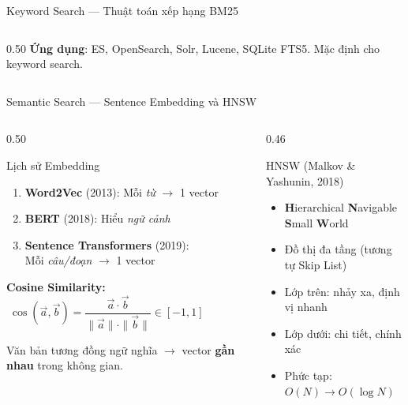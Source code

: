 \begin{frame}{Keyword Search --- Thuật toán xếp hạng BM25}
\begin{columns}[T]
\begin{column}{0.50\textwidth}
\vspace{0.05cm}
{\footnotesize
\textbf{Ứng dụng}: ES, OpenSearch, Solr, Lucene, SQLite FTS5. Mặc định cho keyword search.}

\end{column}
\end{columns}
\end{frame}

\begin{frame}{Semantic Search --- Sentence Embedding và HNSW}
\begin{columns}[T]
\begin{column}{0.50\textwidth}

\begin{block}{Lịch sử Embedding}
{\small
\begin{enumerate}\itemsep0pt \parskip0pt 
    \item \textbf{Word2Vec} (2013): Mỗi \textit{từ} $\to$ 1 vector
    \item \textbf{BERT} (2018): Hiểu \textit{ngữ cảnh}
    \item \textbf{Sentence Transformers} (2019):\\Mỗi \textit{câu/đoạn} $\to$ 1 vector
\end{enumerate}
}
\end{block}

\vspace{0.05cm}

\textbf{Cosine Similarity:}
$\;\cos(\vec{a}, \vec{b}) = \dfrac{\vec{a} \cdot \vec{b}}{\|\vec{a}\| \cdot \|\vec{b}\|} \in [-1, 1]$

\vspace{0.1cm}
{\footnotesize Văn bản tương đồng ngữ nghĩa $\to$ vector \textbf{gần nhau} trong không gian.}

\end{column}
\begin{column}{0.46\textwidth}

\begin{exampleblock}{HNSW {\scriptsize (Malkov \& Yashunin, 2018)}}
{\small
\begin{itemize}\itemsep0pt \parskip0pt 
    \item \textbf{H}ierarchical \textbf{N}avigable \textbf{S}mall \textbf{W}orld
    \item Đồ thị đa tầng (tương tự Skip List)
    \item Lớp trên: nhảy xa, định vị nhanh
    \item Lớp dưới: chi tiết, chính xác
    \item Phức tạp: $O(N) \to O(\log N)$
\end{itemize}
}
\end{exampleblock}


\end{column}
\end{columns}
\end{frame}
